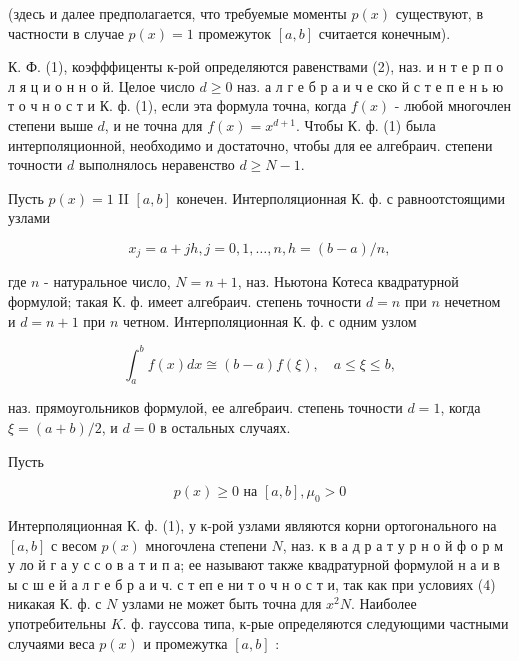 \documentclass[10pt]{article}
\begin{document}
(здесь и далее предполагается, что требуемые моменты $p(x)$ существуют, в частности в случае $p(x)=1$ промежуток $[a, b]$ считается конечным).



К. Ф. (1), коэфффиценты к-рой определяются равенствами (2), наз. и н т е р п о л я ц и о н н о й. Целое число $d \geqslant 0$ наз. а л г е б р а и ч е ско й с т е п е н ь ю т о ч н о с т и К. ф. (1), если эта формула точна, когда $f(x)$ - любой многочлен степени выше $d$, и не точна для $f(x)=x^{d+1}$. Чтобы К. ф. (1) была интерполяционной, необходимо и достаточно, чтобы для ее алгебраич. степени точности $d$ выполнялось неравенство $d \geqslant N-1$.



Пусть $p(x)=1$ II $[a, b]$ конечен. Интерполяционная К. ф. с равноотстоящими узлами



\[

x_{j}=a+j h, j=0,1, \ldots, n, h=(b-a) / n,

\]



где $n$ - натуральное число, $N=n+1$, наз. Ньютона Котеса квадратурной формулой; такая К. ф. имеет алгебраич. степень точности $d=n$ при $n$ нечетном и $d=n+1$ при $n$ четном. Интерполяционная К. ф. с одним узлом



\[

\int_{a}^{b} f(x) d x \cong(b-a) f(\xi), \quad a \leqslant \xi \leqslant b,

\]



наз. прямоугольников формулой, ее алгебраич. степень точности $d=1$, когда $\xi=(a+b) / 2$, и $d=0$ в остальных случаях.



Пусть



\[

p(x) \geqslant 0 \text { на }[a, b], \mu_{0}>0

\]



Интерполяционная К. ф. (1), у к-рой узлами являются корни ортогонального на $[a, b]$ с весом $p(x)$ многочлена степени $N$, наз. к в а д р а т у р н о й ф о р м у ло й г а у с с о в а т и п а; ее называют также квадратурной формулой н а и в ы с ш е й а л г е б р а и ч. с т еп е ни т о ч н о с т и, так как при условиях (4) никакая К. ф. с $N$ узлами не может быть точна для $x^{2} N$. Наиболее употребительны $K$. ф. гауссова типа, к-рые определяются следующими частными случаями веса $p(x)$ и промежутка $[a, b]$ :
\end{document}

